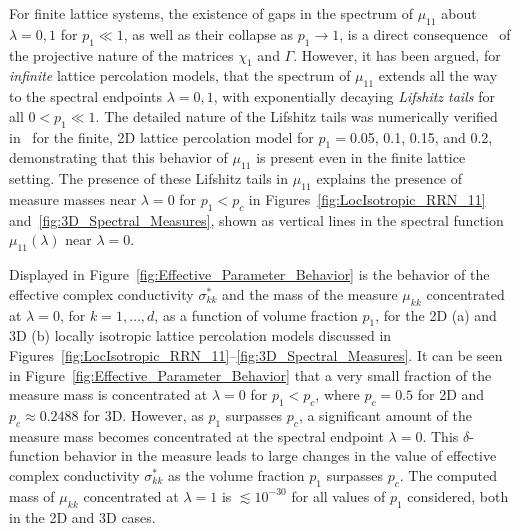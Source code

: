 \documentclass{cmslatex}
\begin{document}
For finite lattice systems, the existence of gaps in the spectrum of
$\mu_{11}$ about $\lambda=0,1$ for $p_1\ll1$, as well as their
collapse as $p_1\to1$, is a direct consequence~\cite{Murphy:JMP:063506} of the
projective nature of the matrices $\chi_1$ and $\Gamma$. However, it has been
argued, for \emph{infinite} lattice percolation models, that the spectrum of
$\mu_{11}$ 
extends all the way to the spectral endpoints $\lambda=0,1$, with
exponentially decaying \emph{Lifshitz tails} for all $0<p_1\ll1$. The
detailed nature of the Lifshitz tails was numerically verified
in~\cite{Jonckheere_Luck_JPA_1998} for the finite, 2D lattice
percolation model for $p_1=$0.05, 0.1, 0.15, and 0.2, demonstrating that this
behavior of $\mu_{11}$ is present even in the finite lattice
setting. The presence of these Lifshitz tails in $\mu_{11}$ explains the
presence of measure masses near $\lambda=0$ for $p_1<p_c$ in
Figures~\ref{fig:LocIsotropic_RRN_11}
and~\ref{fig:3D_Spectral_Measures}, shown as vertical lines in the
spectral function $\mu_{11}(\lambda)$ near $\lambda=0$.    

 





Displayed in Figure~\ref{fig:Effective_Parameter_Behavior} is the
behavior of the effective complex conductivity $\sigma^*_{kk}$ and the
mass of the measure $\mu_{kk}$ concentrated at $\lambda=0$, for $k=1,\ldots,d$, as
a function of volume fraction $p_1$, for the 2D (a) and 3D (b) locally
isotropic lattice percolation models discussed in
Figures~\ref{fig:LocIsotropic_RRN_11}--\ref{fig:3D_Spectral_Measures}.  
It can be seen in Figure~\ref{fig:Effective_Parameter_Behavior} that a
very small fraction of the 
measure mass is concentrated at $\lambda=0$ for $p_1<p_c$, where $p_c=0.5$
for 2D and $p_c\approx0.2488$ for 3D. However, as $p_1$ surpasses $p_c$, a
significant amount of the measure mass becomes concentrated at the
spectral endpoint $\lambda=0$. This $\delta$-function behavior in the measure
leads to large changes in the value of effective complex 
conductivity $\sigma^*_{kk}$ as the volume fraction $p_1$ surpasses
$p_c$. The computed mass of $\mu_{kk}$ concentrated at $\lambda=1$ is
$\lesssim10^{-30}$ for all values of $p_1$ considered, both in the 2D and 3D
cases.   
\end{document}
